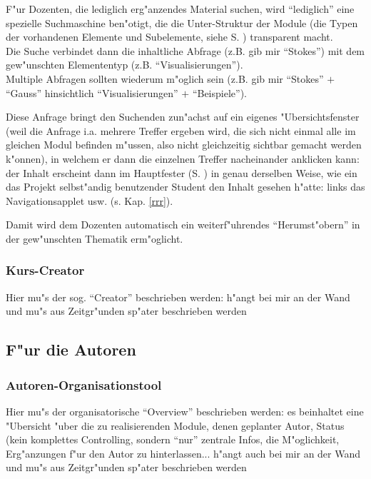F"ur Dozenten, die lediglich erg"anzendes Material suchen, wird
``lediglich'' eine spezielle Suchmaschine ben"otigt, die die
Unter-Struktur der Module (die Typen der vorhandenen Elemente und
Subelemente, siehe S. \pageref{elemente}) transparent macht. \\
Die Suche verbindet dann die inhaltliche Abfrage (z.B. gib mir
``Stokes'') mit dem gew"unschten Elemententyp
(z.B. ``Visualisierungen'').\\ 
Multiple Abfragen sollten wiederum m"oglich sein (z.B. gib mir
``Stokes'' $+$ ``Gauss'' hinsichtlich ``Visualisierungen'' $+$
``Beispiele'').

Diese Anfrage bringt den Suchenden zun"achst auf ein eigenes
"Ubersichtsfenster (weil die Anfrage i.a. mehrere Treffer ergeben
wird, die sich nicht einmal alle im gleichen Modul befinden m"ussen,
also nicht gleichzeitig sichtbar gemacht werden k"onnen), in welchem
er dann die einzelnen Treffer nacheinander anklicken kann: der Inhalt
erscheint dann im Hauptfester (S. \pageref{fenster_namen}) in genau
derselben Weise, wie ein das Projekt selbst"andig benutzender Student
den Inhalt gesehen h"atte: links das Navigationsapplet
usw. (s. Kap. \ref{rrr}).

Damit wird dem Dozenten automatisch ein weiterf"uhrendes
``Herumst"obern'' in der gew"unschten Thematik erm"oglicht.


\subsubsection{Kurs-Creator}


Hier mu"s der sog. ``Creator'' beschrieben werden: h"angt bei mir an
der Wand und mu"s aus Zeitgr"unden sp"ater beschrieben
werden


\subsection{F"ur die Autoren}

\subsubsection{Autoren-Organisationstool}

Hier mu"s der organisatorische ``Overview'' beschrieben werden: es
beinhaltet eine "Ubersicht "uber die zu realisierenden Module, denen
geplanter Autor, Status (kein komplettes Controlling, sondern ``nur''
zentrale Infos, die M"oglichkeit, Erg"anzungen f"ur den Autor zu
hinterlassen...  h"angt auch bei mir an der Wand und mu"s aus
Zeitgr"unden sp"ater beschrieben werden


